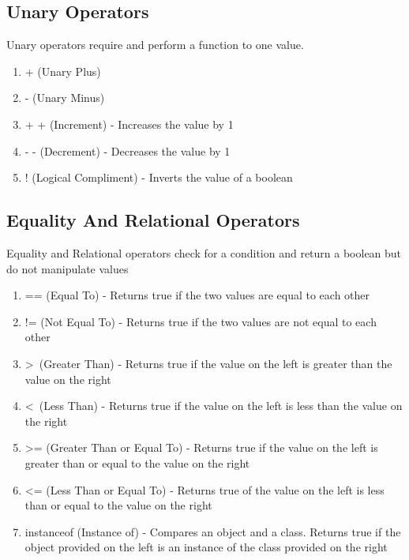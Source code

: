 \documentclass[a4paper]{article}
\begin{document}
\subsection*{Unary Operators}
Unary operators require and perform a function to one value.

\begin{enumerate}

\item + (Unary Plus)

\item - (Unary Minus)

\item + + (Increment) - Increases the value by 1

\item - - (Decrement) - Decreases the value by 1

\item ! (Logical Compliment) - Inverts the value of a boolean

\end{enumerate}

\subsection*{Equality And Relational Operators}
Equality and Relational operators check for a condition and return a boolean but
do not manipulate values
\begin{enumerate}

\item == (Equal To) - Returns true if the two values are equal to each other

\item != (Not Equal To) - Returns true if the two values are not equal to each
other

\item \textgreater \ (Greater Than) - Returns true if the value on the left is greater than
the value on the right

\item \textless \ (Less Than) - Returns true if the value on the left is less than the
value on the right

\item \textgreater = (Greater Than or Equal To) - Returns true if the value on the left is
greater than or equal to the value on the right

\item \textless = (Less Than or Equal To) - Returns true of the value on the left is less
than or equal to the value on the right

\item instanceof (Instance of) - Compares an object and a class. Returns true if
the object provided on the left is an instance of the class provided on the
right

\end{enumerate}
\end{document}

